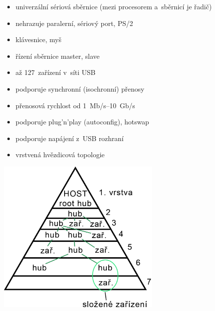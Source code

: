\documentclass[a4paper,12pt]{article}
\providecommand{\tightlist}{%
\setlength{\itemsep}{0pt}\setlength{\parskip}{0pt}}
\begin{document}
\begin{minipage}[b]{0.5\textwidth}
  \begin{itemize}
    \tightlist
    \item univerzální sériová sběrnice (mezi procesorem a~sběrnicí je řadič)
    \item nehrazuje paralerní, sériový port, PS/2
    \item klávesnice, myš
    \item řízení sběrnice master, slave
    \item až 127~zařízení v~síti USB
    \item podporuje synchronní (isochronní) přenosy
    \item přenosová rychlost od 1~Mb/s--10~Gb/s
    \item podporuje plug'n'play (autoconfig), hotswap
    \item podporuje napájení z~USB rozhraní
    \item vrstvená hvězdicová topologie
  \end{itemize}
\end{minipage}%
\begin{minipage}[t]{0.45\textwidth}
  \includegraphics[width=8cm]{ref/usb-structure.png}
\end{minipage}%
\end{document}
